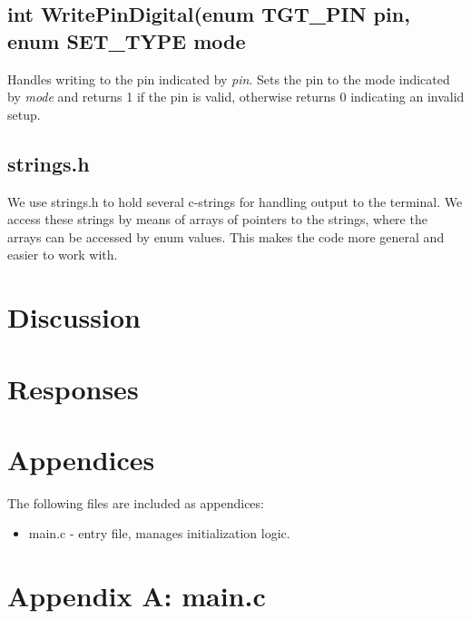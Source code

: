 \documentclass[letterpaper,11pt]{texMemo} %
\begin{document}
\subsection*{int WritePinDigital(enum TGT\_PIN pin, enum SET\_TYPE mode}
Handles writing to the pin indicated by \textit{pin}. Sets the pin to the mode indicated by \textit{mode} and returns 1 if the pin is valid, otherwise returns 0 indicating an invalid setup.
\subsection*{strings.h}
We use strings.h to hold several c-strings for handling output to the terminal. We access these strings by means of arrays of pointers to the strings, where the arrays can be accessed by enum values. This makes the code more general and easier to work with.

\section*{Discussion}


\newpage
\section*{Responses}


\section*{Appendices}
The following files are included as appendices:
\begin{itemize}
\item main.c - entry file, manages initialization logic.
\end{itemize}
\newpage

\section*{Appendix A: main.c}
\begin{tiny}

\end{tiny}
\newpage
\end{document}
